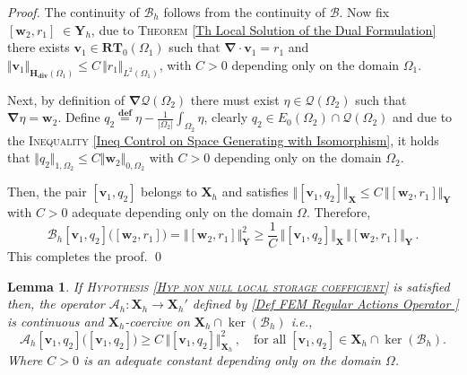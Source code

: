 \documentclass[3p]{elsarticle}
\newtheorem{lemma}[theorem]{Lemma}
\def\A{{\mathcal A}}
\def\B{{\mathcal B}}
\def\X{\mathbf X}
\def\Y{\mathbf Y}
\def\div{\bm{\nabla} \cdot}
\def\grad{\bm{\nabla}}
\def\Hdiv{\mathbf{H_{div}}}
\def\wtwo{\mathbf{w}_{2}}
\def\vone{\mathbf{v}_{1}}
\def\qtwo{q_{2}}
\def\rone{r_{1}}
\def\defining{\overset{\mathbf{def}} =}
\def\mapone{\mathcal{G}_{1} }%
\def\maptwo{\mathcal{G}_{2}} %
\begin{document}
%
\begin{proof}
The continuity of $\B_{h}$ follows from the continuity of $\B$. Now fix $[\wtwo, \rone]\;\in \Y_{h}$, due to \textsc{Theorem} \ref{Th Local Solution of the Dual Formulation} there exists $\vone\in \mathbf{RT}_{0}(\Omega_{1})$ such that $\div \vone = \rone$ and $\Vert \vone \Vert_{\Hdiv(\Omega_{1})} \leq C\, \Vert \rone\Vert_{L^{2}(\Omega_{1})}$, with $C>0$ depending only on the domain $\Omega_{1}$.

Next, by definition of $\grad \mathcal{Q}(\Omega_{2})$ there must exist $\eta\in \mathcal{Q}(\Omega_{2})$ such that $\grad \eta = \wtwo$. Define $\qtwo \defining \eta - \frac{1}{\vert \Omega_{2}\vert} \int_{\Omega_{2}}\eta$, clearly $\qtwo \in E_{0}(\Omega_{2}) \cap \mathcal{Q}(\Omega_{2})$ and due to the \textsc{Inequality} \eqref{Ineq Control on Space Generating with Isomorphism}, it holds that $\Vert \qtwo \Vert_{1, \Omega_{2}} \leq C \Vert \wtwo \Vert_{0, \Omega_{2}}$ with $C>0$ depending only on the domain $\Omega_{2}$.

Then, the pair $[\vone, \qtwo]$ belongs to $\X_{h}$ and satisfies $\big\Vert [\vone, \qtwo] \Vert_{\X} \leq C  \, \big\Vert [\wtwo, \rone] \big\Vert_{\Y} $ with $C>0$ adequate depending only on the domain $\Omega$. Therefore,
%
\begin{equation*}
   \B_{h} [\vone, \qtwo]\big([\wtwo, \rone]\big) = \big\Vert [\wtwo, \rone] \big\Vert_{\Y}^{2} 
   \geq  \frac{1}{C}\,  
   \big\Vert [\vone, \qtwo] \big\Vert_{\X} \, 
   \big\Vert [\wtwo, \rone] \big\Vert_{\Y} \,  .
\end{equation*}
% 
This completes the proof.
%
\qed
%
\end{proof}
%
%
% 
%
\begin{lemma}\label{Th FEM coercivity of A on ker B}
If \textsc{Hypothesis \ref{Hyp non null local storage coefficient}} is satisfied then, the operator $\A_{h}:\X_{h}\rightarrow \X_{h} '$ defined by \eqref{Def FEM Regular Actions Operator } is continuous and $\X_{h}$-coercive on $\X_{h}\cap \ker (\B_{h})$ i.e., 
%
\begin{equation}\label{Ineq FEM charaterization of alpha}
\A_{h}[\vone, \qtwo] \big([\vone, \qtwo]\big)\geq  C \,
\big\Vert[\vone, \qtwo] \big\Vert_{\X_{h}}^{2} \,,\quad 
\text{for all}\; [\vone, \qtwo]\in \X_{h}\cap \ker (\B_{h}) .
\end{equation}
%
Where $C>0$ is an adequate constant depending only on the domain $\Omega$.
%
\end{lemma}
\end{document}
